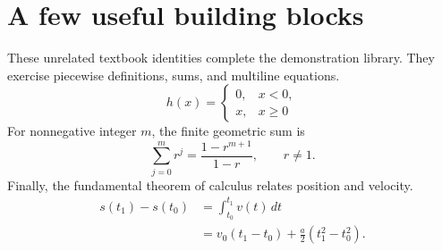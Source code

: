 \section{A few useful building blocks}
These unrelated textbook identities complete the demonstration library.
They exercise piecewise definitions, sums, and multiline equations.
\begin{equation}
  h(x)=\begin{cases}
    0, & x<0,\\
    x, & x\geq 0
  \end{cases}
  \label{eq:positive_part}
\end{equation}
For nonnegative integer $m$, the finite geometric sum is
\begin{equation}
  \sum_{j=0}^{m} r^j = \frac{1-r^{m+1}}{1-r}, \qquad r\neq 1.
  \label{eq:geometric_sum}
\end{equation}
Finally, the fundamental theorem of calculus relates position and velocity.
\begin{align}
  s(t_1)-s(t_0) &= \int_{t_0}^{t_1}v(t)\,dt \\
    &= v_0(t_1-t_0)+\frac{a}{2}(t_1^2-t_0^2).
  \label{eq:displacement}
\end{align}
